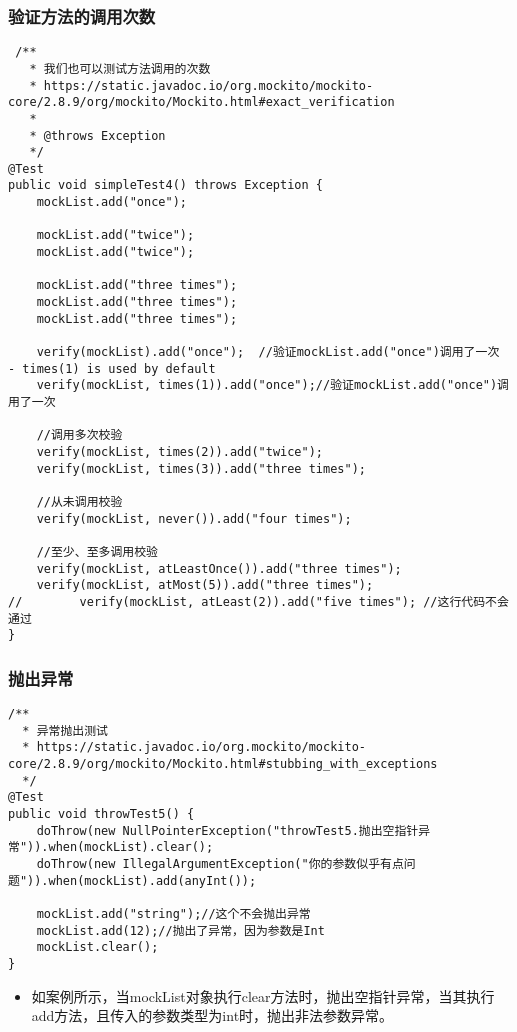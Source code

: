 \documentclass[9pt, b5paper]{article}
\begin{document}
\subsubsection{验证方法的调用次数}
\label{sec-1-1-4}
\begin{verbatim}
 /**
   * 我们也可以测试方法调用的次数
   * https://static.javadoc.io/org.mockito/mockito-core/2.8.9/org/mockito/Mockito.html#exact_verification
   *
   * @throws Exception
   */
@Test
public void simpleTest4() throws Exception {
    mockList.add("once");

    mockList.add("twice");
    mockList.add("twice");

    mockList.add("three times");
    mockList.add("three times");
    mockList.add("three times");

    verify(mockList).add("once");  //验证mockList.add("once")调用了一次 - times(1) is used by default
    verify(mockList, times(1)).add("once");//验证mockList.add("once")调用了一次

    //调用多次校验
    verify(mockList, times(2)).add("twice");
    verify(mockList, times(3)).add("three times");

    //从未调用校验
    verify(mockList, never()).add("four times");

    //至少、至多调用校验
    verify(mockList, atLeastOnce()).add("three times");
    verify(mockList, atMost(5)).add("three times");
//        verify(mockList, atLeast(2)).add("five times"); //这行代码不会通过
}
\end{verbatim}
\subsubsection{抛出异常}
\label{sec-1-1-5}
\begin{verbatim}
/**
  * 异常抛出测试
  * https://static.javadoc.io/org.mockito/mockito-core/2.8.9/org/mockito/Mockito.html#stubbing_with_exceptions
  */
@Test
public void throwTest5() {
    doThrow(new NullPointerException("throwTest5.抛出空指针异常")).when(mockList).clear();
    doThrow(new IllegalArgumentException("你的参数似乎有点问题")).when(mockList).add(anyInt());

    mockList.add("string");//这个不会抛出异常
    mockList.add(12);//抛出了异常，因为参数是Int
    mockList.clear();
}
\end{verbatim}
\begin{itemize}
\item 如案例所示，当mockList对象执行clear方法时，抛出空指针异常，当其执行add方法，且传入的参数类型为int时，抛出非法参数异常。
\end{itemize}
\end{document}
